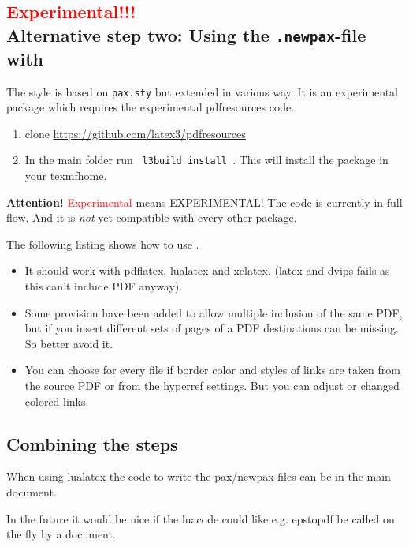 \documentclass[DIV=12,parskip=half-,bibliography=totoc]{scrartcl}
\begin{document}


\subsection[Alternative step two: Using the \texttt{.newpax}-file with \pkg{newpax.sty}]
{\textcolor{red}{Experimental!!!}\\ Alternative step two: Using the \texttt{.newpax}-file with }


The style  is based on \texttt{pax.sty} but extended in various way. It is an experimental package which requires the experimental pdfresources code.

\begin{enumerate}
\item clone \url{https://github.com/latex3/pdfresources}
\item In the main folder run \lstinline+ l3build install +. This will install the package in your texmfhome.
\end{enumerate}

\textbf{Attention!} \textcolor{red}{Experimental} means EXPERIMENTAL! The code is currently in full flow. And it is \emph{not} yet compatible with every other package.

The following listing shows how to use .

\begin{itemize}
\item It should work with pdflatex, lualatex and xelatex. (latex and dvips fails as this can't include PDF anyway).
\item Some provision have been added to allow multiple inclusion of the same PDF, but if you insert different sets of pages of a PDF destinations can be missing. So better avoid it. 
\item You can choose for every file if border color and styles of links are taken from the source PDF or from the hyperref settings. But you can adjust or changed colored links. 
\end{itemize}

\subsection{Combining the steps}

When using lualatex the code to write the pax/newpax-files can be in the main document. 

In the future it would be nice if the luacode could like e.g. epstopdf be called on the fly by a document. 
\end{document}

